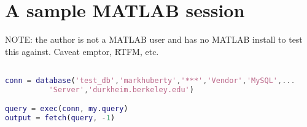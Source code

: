 \documentclass[11pt]{article}
\begin{document}
\section{A sample MATLAB session}
\label{sec:sample-matl-sess}

\begin{center}
  NOTE: the author is not a MATLAB user and has no MATLAB install to
  test this against. Caveat emptor, RTFM, etc. 
\end{center}

\begin{lstlisting}[language=matlab, numbers=none, frame=single]

conn = database('test_db','markhuberty','***','Vendor','MySQL',...
          'Server','durkheim.berkeley.edu')

query = exec(conn, my.query)
output = fetch(query, -1)
\end{lstlisting}
\end{document}
